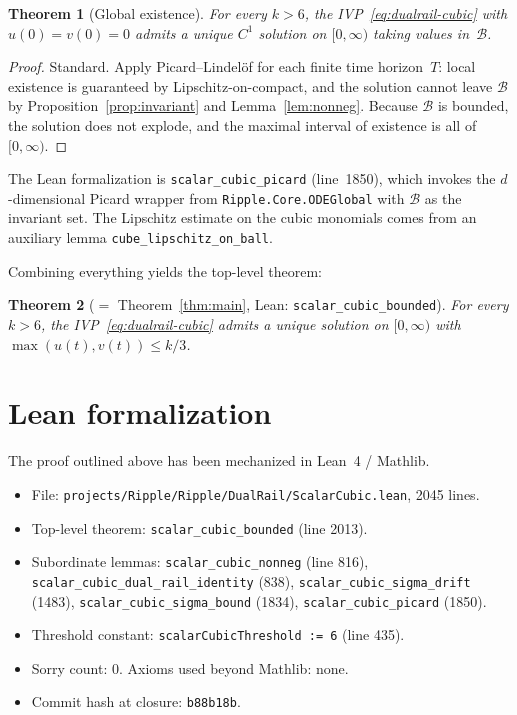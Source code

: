 \documentclass[11pt]{article}
\newtheorem{theorem}{Theorem}
\begin{document}
\begin{theorem}[Global existence]\label{thm:picard}
For every $k > 6$, the IVP~\eqref{eq:dualrail-cubic} with $u(0) = v(0) = 0$
admits a unique $C^{1}$ solution on $[0, \infty)$ taking values in~$\mathcal{B}$.
\end{theorem}

\begin{proof}
Standard.  Apply Picard--Lindel\"of for each finite time horizon~$T$: local
existence is guaranteed by Lipschitz-on-compact, and the solution cannot leave
$\mathcal{B}$ by Proposition~\ref{prop:invariant} and Lemma~\ref{lem:nonneg}.
Because $\mathcal{B}$ is bounded, the solution does not explode, and the
maximal interval of existence is all of $[0, \infty)$.
\end{proof}

The Lean formalization is \texttt{scalar\_cubic\_picard} (line~1850), which
invokes the $d$-dimensional Picard wrapper from \texttt{Ripple.Core.ODEGlobal}
with $\mathcal{B}$ as the invariant set.  The Lipschitz estimate on the cubic
monomials comes from an auxiliary lemma \texttt{cube\_lipschitz\_on\_ball}.

\medskip

Combining everything yields the top-level theorem:

\begin{theorem}[$=$ Theorem~\ref{thm:main}, Lean:
\texttt{scalar\_cubic\_bounded}]
For every $k > 6$, the IVP~\eqref{eq:dualrail-cubic} admits a unique solution on
$[0, \infty)$ with $\max(u(t), v(t)) \le k/3$.
\end{theorem}

\section{Lean formalization}

The proof outlined above has been mechanized in Lean~4 / Mathlib.

\begin{itemize}
\item File: \texttt{projects/Ripple/Ripple/DualRail/ScalarCubic.lean},
      2045 lines.
\item Top-level theorem: \texttt{scalar\_cubic\_bounded} (line 2013).
\item Subordinate lemmas: \texttt{scalar\_cubic\_nonneg} (line 816),
      \texttt{scalar\_cubic\_dual\_rail\_identity} (838),
      \texttt{scalar\_cubic\_sigma\_drift} (1483),
      \texttt{scalar\_cubic\_sigma\_bound} (1834),
      \texttt{scalar\_cubic\_picard} (1850).
\item Threshold constant: \texttt{scalarCubicThreshold := 6} (line 435).
\item Sorry count: 0.  Axioms used beyond Mathlib: none.
\item Commit hash at closure: \texttt{b88b18b}.
\end{itemize}
\end{document}
